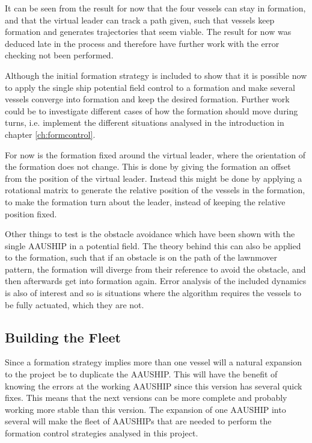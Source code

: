It can be seen from the result for now that the four vessels can stay in formation, and that the virtual leader can track a path given, such that vessels keep formation and generates trajectories that seem viable. The result for now was deduced late in the process and therefore have further work with the error checking not been performed.

Although the initial formation strategy is included to show that it is possible now to apply the single ship potential field control to a formation and make several vessels converge into formation and keep the desired formation. Further work could be to investigate different cases of how the formation should move during turns, i.e. implement the different situations analysed in the introduction in chapter \ref{ch:formcontrol}.

For now is the formation fixed around the virtual leader, where the orientation of the formation does not change. This is done by giving the formation an offset from the position of the virtual leader. Instead this might be done by applying a rotational matrix to generate the relative position of the vessels in the formation, to make the formation turn about the leader, instead of keeping the relative position fixed.

Other things to test is the obstacle avoidance which have been shown with the single AAUSHIP in a potential field. The theory behind this can also be applied to the formation, such that if an obstacle is on the path of the lawnmover pattern, the formation will diverge from their reference to avoid the obstacle, and then afterwards get into formation again. Error analysis of the included dynamics is also of interest and so is situations where the algorithm requires the vessels to be fully actuated, which they are not.

\subsection{Building the Fleet}
Since a formation strategy implies more than one vessel will a natural expansion to the project be to duplicate the AAUSHIP. This will have the benefit of knowing the errors at the working AAUSHIP since this version has several quick fixes. This means that the next versions can be more complete and probably working more stable than this version. The expansion of one AAUSHIP into several will make the fleet of AAUSHIPs that are needed to perform the formation control strategies analysed in this project.

